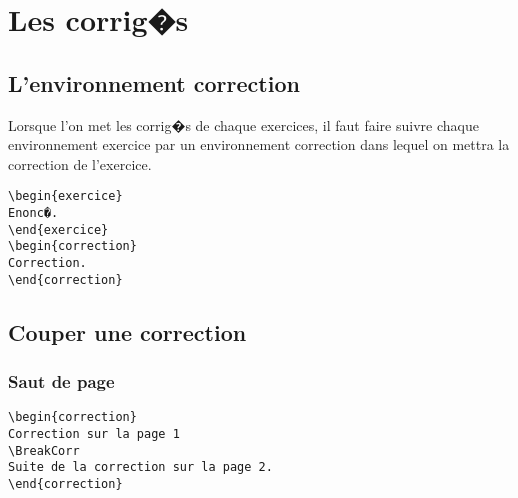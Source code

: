 \documentclass[ams,openany,10pt,presentation,latin1]{mathbook}
\begin{document}
\begin{multicols}{2}
\begin{exercice}
\lipsum[1]
\end{exercice}

\begin{exercice}
\lipsum[1]
\end{exercice}
\end{multicols}

\newpage\pagecolor{white}

\section{Les corrig�s}

\subsection{L'environnement \og correction \fg}
Lorsque l'on met les corrig�s de chaque exercices, il faut faire suivre chaque environnement \og exercice \fg{} par un environnement \og correction \fg{} dans lequel on mettra la correction de l'exercice.

\medskip

\begin{lstlisting}
\begin{exercice}
Enonc�.
\end{exercice}
\begin{correction}
Correction.
\end{correction}
\end{lstlisting}

\subsection{Couper une correction}

\subsubsection{Saut de page}

\begin{lstlisting}
\begin{correction}
Correction sur la page 1
\BreakCorr
Suite de la correction sur la page 2.
\end{correction}
\end{lstlisting}
\end{document}
